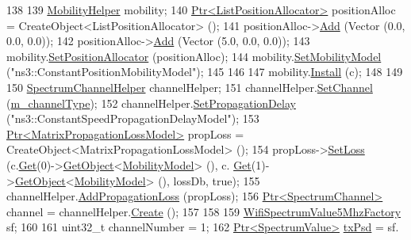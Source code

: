 \begin{DoxyCode}
138 
139   \hyperlink{classns3_1_1MobilityHelper}{MobilityHelper} mobility;
140   \hyperlink{classns3_1_1Ptr}{Ptr<ListPositionAllocator>} positionAlloc = CreateObject<ListPositionAllocator> 
      ();
141   positionAlloc->\hyperlink{classns3_1_1ListPositionAllocator_a460e82f015ac012a73ba0ea0cccb3486}{Add} (Vector (0.0, 0.0, 0.0));
142   positionAlloc->\hyperlink{classns3_1_1ListPositionAllocator_a460e82f015ac012a73ba0ea0cccb3486}{Add} (Vector (5.0, 0.0, 0.0));
143   mobility.\hyperlink{classns3_1_1MobilityHelper_ac59d5295076be3cc11021566713a28c5}{SetPositionAllocator} (positionAlloc);
144   mobility.\hyperlink{classns3_1_1MobilityHelper_a030275011b6f40682e70534d30280aba}{SetMobilityModel} (\textcolor{stringliteral}{"ns3::ConstantPositionMobilityModel"});
145 
146 
147   mobility.\hyperlink{classns3_1_1MobilityHelper_a07737960ee95c0777109cf2994dd97ae}{Install} (c);
148 
149 
150   \hyperlink{classns3_1_1SpectrumChannelHelper}{SpectrumChannelHelper} channelHelper;
151   channelHelper.\hyperlink{classns3_1_1SpectrumChannelHelper_a11ffe86edea8cdd30f181e41c0e3e29f}{SetChannel} (\hyperlink{classSpectrumIdealPhyTestCase_ab3092a940350615eb0353ad6a640186c}{m\_channelType});
152   channelHelper.\hyperlink{classns3_1_1SpectrumChannelHelper_a61788598e0bcb0ac0d0530970a0fca2c}{SetPropagationDelay} (\textcolor{stringliteral}{"ns3::ConstantSpeedPropagationDelayModel"});
153   \hyperlink{classns3_1_1Ptr}{Ptr<MatrixPropagationLossModel>} propLoss = 
      CreateObject<MatrixPropagationLossModel> ();  
154   propLoss->\hyperlink{classns3_1_1MatrixPropagationLossModel_a16fd1f9be7b7246423818632d710947d}{SetLoss} (c.\hyperlink{classns3_1_1NodeContainer_a9ed96e2ecc22e0f5a3d4842eb9bf90bf}{Get}(0)->\hyperlink{classns3_1_1Object_a13e18c00017096c8381eb651d5bd0783}{GetObject}<\hyperlink{classns3_1_1MobilityModel}{MobilityModel}> (), c.
      \hyperlink{classns3_1_1NodeContainer_a9ed96e2ecc22e0f5a3d4842eb9bf90bf}{Get}(1)->\hyperlink{classns3_1_1Object_a13e18c00017096c8381eb651d5bd0783}{GetObject}<\hyperlink{classns3_1_1MobilityModel}{MobilityModel}> (), lossDb, \textcolor{keyword}{true});
155   channelHelper.\hyperlink{classns3_1_1SpectrumChannelHelper_ab23845170770bda5be7ee8a2b42c452b}{AddPropagationLoss} (propLoss);
156   \hyperlink{classns3_1_1Ptr}{Ptr<SpectrumChannel>} channel = channelHelper.\hyperlink{classns3_1_1SpectrumChannelHelper_a419ea84f5046763085f94f38af319fb9}{Create} ();
157 
158 
159   \hyperlink{classns3_1_1WifiSpectrumValue5MhzFactory}{WifiSpectrumValue5MhzFactory} sf;
160 
161   uint32\_t channelNumber = 1;
162   \hyperlink{classns3_1_1Ptr}{Ptr<SpectrumValue>} \hyperlink{lte__link__budget_8m_a684fe3101a5e48a5fcc57cab8dbcd1aa}{txPsd} =  sf.

\end{DoxyCode}
